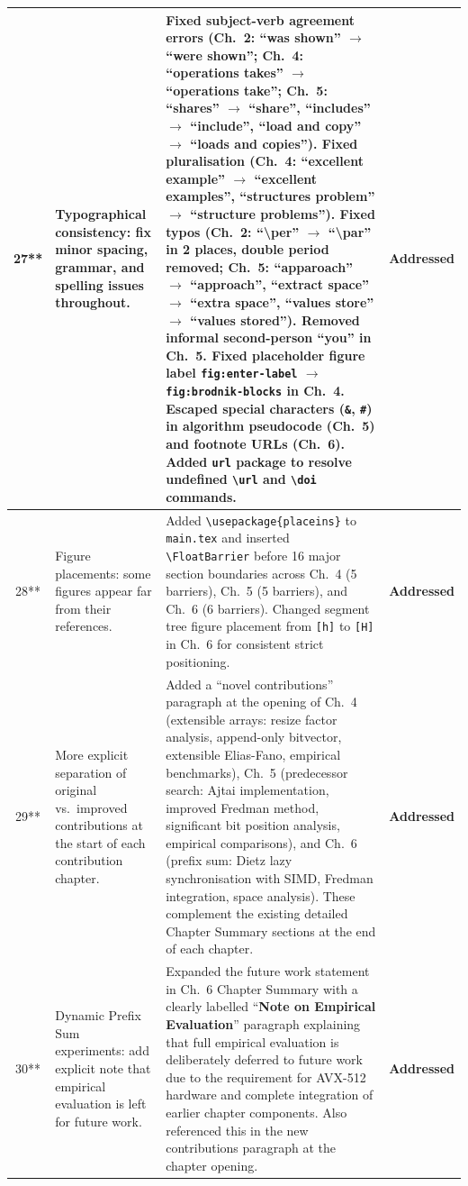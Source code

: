 \documentclass[12pt,a4paper]{article}
\newcommand{\addressed}{\textbf{Addressed}}
\begin{document}
\begin{longtable}{@{}c L{4.8cm} L{7.2cm} L{2.2cm}@{}}
27** &
Typographical consistency: fix minor spacing, grammar, and spelling issues throughout. &
Fixed subject-verb agreement errors (Ch.~2: ``was shown'' $\to$ ``were shown''; Ch.~4: ``operations takes'' $\to$ ``operations take''; Ch.~5: ``shares'' $\to$ ``share'', ``includes'' $\to$ ``include'', ``load and copy'' $\to$ ``loads and copies''). Fixed pluralisation (Ch.~4: ``excellent example'' $\to$ ``excellent examples'', ``structures problem'' $\to$ ``structure problems''). Fixed typos (Ch.~2: ``\textbackslash per'' $\to$ ``\textbackslash par'' in 2 places, double period removed; Ch.~5: ``apparoach'' $\to$ ``approach'', ``extract space'' $\to$ ``extra space'', ``values store'' $\to$ ``values stored''). Removed informal second-person ``you'' in Ch.~5. Fixed placeholder figure label \texttt{fig:enter-label} $\to$ \texttt{fig:brodnik-blocks} in Ch.~4. Escaped special characters (\texttt{\&}, \texttt{\#}) in algorithm pseudocode (Ch.~5) and footnote URLs (Ch.~6). Added \texttt{url} package to resolve undefined \texttt{\textbackslash url} and \texttt{\textbackslash doi} commands. &
\addressed \\
\midrule

28** &
Figure placements: some figures appear far from their references. &
Added \texttt{\textbackslash usepackage\{placeins\}} to \texttt{main.tex} and inserted \texttt{\textbackslash FloatBarrier} before 16 major section boundaries across Ch.~4 (5 barriers), Ch.~5 (5 barriers), and Ch.~6 (6 barriers). Changed segment tree figure placement from \texttt{[h]} to \texttt{[H]} in Ch.~6 for consistent strict positioning. &
\addressed \\
\midrule

29** &
More explicit separation of original vs.\ improved contributions at the start of each contribution chapter. &
Added a ``novel contributions'' paragraph at the opening of Ch.~4 (extensible arrays: resize factor analysis, append-only bitvector, extensible Elias-Fano, empirical benchmarks), Ch.~5 (predecessor search: Ajtai implementation, improved Fredman method, significant bit position analysis, empirical comparisons), and Ch.~6 (prefix sum: Dietz lazy synchronisation with SIMD, Fredman integration, space analysis). These complement the existing detailed Chapter Summary sections at the end of each chapter. &
\addressed \\
\midrule

30** &
Dynamic Prefix Sum experiments: add explicit note that empirical evaluation is left for future work. &
Expanded the future work statement in Ch.~6 Chapter Summary with a clearly labelled ``\textbf{Note on Empirical Evaluation}'' paragraph explaining that full empirical evaluation is deliberately deferred to future work due to the requirement for AVX-512 hardware and complete integration of earlier chapter components. Also referenced this in the new contributions paragraph at the chapter opening. &
\addressed \\

\end{longtable}
\end{document}
